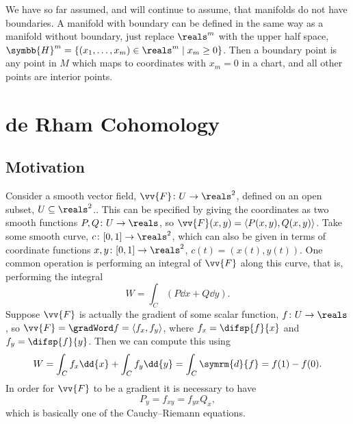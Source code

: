 \documentclass[fleqn]{NotesClass}
\renewcommand{\dl}{\symrm{d}}
\begin{document}
    \begin{remark}{}{}
        We have so far assumed, and will continue to assume, that manifolds do not have boundaries.
        A manifold with boundary can be defined in the same way as a manifold without boundary, just replace \(\reals^m\) with the upper half space, \(\symbb{H}^m = \{(x_1, \dotsc, x_m) \in \reals^m \mid x_m \ge 0\}\).
        Then a boundary point is any point in \(M\) which maps to coordinates with \(x_m = 0\) in a chart, and all other points are interior points.
    \end{remark}
    
    
    \chapter{de Rham Cohomology}
    \section{Motivation}
    Consider a smooth vector field,  \(\vv{F} \colon U \to \reals^2\), defined on an open subset, \(U \subseteq \reals^2\)..
    This can be specified by giving the coordinates as two smooth functions \(P, Q \colon U \to \reals\), so \(\vv{F}(x, y) = \langle P(x, y), Q(x, y) \rangle\).
    Take some smooth curve, \(c \colon [0, 1] \to \reals^2\), which can also be given in terms of coordinate functions \(x, y \colon [0, 1] \to \reals^2\), \(c(t) = (x(t), y(t))\).
    One common operation is performing an integral of \(\vv{F}\) along this curve, that is, performing the integral
    \begin{equation}
        W = \int_C (P \dd{x} + Q\dd{y}).
    \end{equation}
    Suppose \(\vv{F}\) is actually the gradient of some scalar function, \(f \colon U \to \reals\), so \(\vv{F} = \gradWord f = \langle f_x, f_y \rangle\), where \(f_x = \difsp{f}{x}\) and \(f_y = \difsp{f}{y}\).
    Then we can compute this using
    \begin{equation}
        W = \int_C f_x \dd{x} + \int_C f_y \dd{y} = \int_C \dl{f} = f(1) - f(0).
    \end{equation}
    In order for \(\vv{F}\) to be a gradient it is necessary to have
    \begin{equation}
        P_y = f_{xy} = f_{yx}  Q_x,
    \end{equation}
    which is basically one of the Cauchy--Riemann equations.
    
\end{document}
